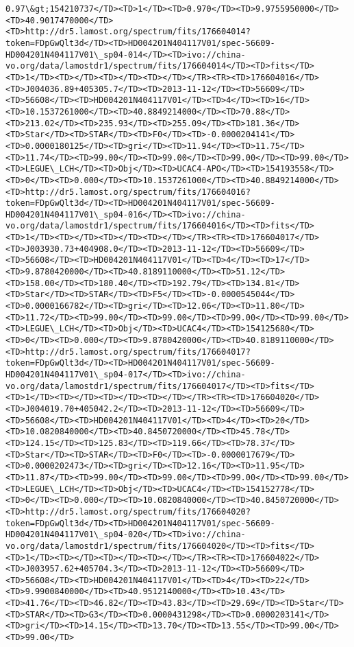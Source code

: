 \documentclass[11pt]{article}
\begin{document}
\begin{Verbatim}[commandchars=\\\{\}]
0.97\&gt;154210737</TD><TD>1</TD><TD>0.970</TD><TD>9.9755950000</TD><TD>40.9017470000</TD><TD>http://dr5.lamost.org/spectrum/fits/176604014?token=FDpGwQlt3d</TD><TD>HD004201N404117V01/spec-56609-HD004201N404117V01\_sp04-014</TD><TD>ivo://china-vo.org/data/lamostdr1/spectrum/fits/176604014</TD><TD>fits</TD><TD>1</TD><TD></TD><TD></TD><TD></TD></TR><TR><TD>176604016</TD><TD>J004036.89+405305.7</TD><TD>2013-11-12</TD><TD>56609</TD><TD>56608</TD><TD>HD004201N404117V01</TD><TD>4</TD><TD>16</TD><TD>10.1537261000</TD><TD>40.8849214000</TD><TD>70.88</TD><TD>213.02</TD><TD>235.93</TD><TD>255.09</TD><TD>181.36</TD><TD>Star</TD><TD>STAR</TD><TD>F0</TD><TD>-0.0000204141</TD><TD>0.0000180125</TD><TD>gri</TD><TD>11.94</TD><TD>11.75</TD><TD>11.74</TD><TD>99.00</TD><TD>99.00</TD><TD>99.00</TD><TD>99.00</TD><TD>LEGUE\_LCH</TD><TD>Obj</TD><TD>UCAC4-APO</TD><TD>154193558</TD><TD>0</TD><TD>0.000</TD><TD>10.1537261000</TD><TD>40.8849214000</TD><TD>http://dr5.lamost.org/spectrum/fits/176604016?token=FDpGwQlt3d</TD><TD>HD004201N404117V01/spec-56609-HD004201N404117V01\_sp04-016</TD><TD>ivo://china-vo.org/data/lamostdr1/spectrum/fits/176604016</TD><TD>fits</TD><TD>1</TD><TD></TD><TD></TD><TD></TD></TR><TR><TD>176604017</TD><TD>J003930.73+404908.0</TD><TD>2013-11-12</TD><TD>56609</TD><TD>56608</TD><TD>HD004201N404117V01</TD><TD>4</TD><TD>17</TD><TD>9.8780420000</TD><TD>40.8189110000</TD><TD>51.12</TD><TD>158.00</TD><TD>180.40</TD><TD>192.79</TD><TD>134.81</TD><TD>Star</TD><TD>STAR</TD><TD>F5</TD><TD>-0.0000545044</TD><TD>0.0000166782</TD><TD>gri</TD><TD>12.06</TD><TD>11.80</TD><TD>11.72</TD><TD>99.00</TD><TD>99.00</TD><TD>99.00</TD><TD>99.00</TD><TD>LEGUE\_LCH</TD><TD>Obj</TD><TD>UCAC4</TD><TD>154125680</TD><TD>0</TD><TD>0.000</TD><TD>9.8780420000</TD><TD>40.8189110000</TD><TD>http://dr5.lamost.org/spectrum/fits/176604017?token=FDpGwQlt3d</TD><TD>HD004201N404117V01/spec-56609-HD004201N404117V01\_sp04-017</TD><TD>ivo://china-vo.org/data/lamostdr1/spectrum/fits/176604017</TD><TD>fits</TD><TD>1</TD><TD></TD><TD></TD><TD></TD></TR><TR><TD>176604020</TD><TD>J004019.70+405042.2</TD><TD>2013-11-12</TD><TD>56609</TD><TD>56608</TD><TD>HD004201N404117V01</TD><TD>4</TD><TD>20</TD><TD>10.0820840000</TD><TD>40.8450720000</TD><TD>45.78</TD><TD>124.15</TD><TD>125.83</TD><TD>119.66</TD><TD>78.37</TD><TD>Star</TD><TD>STAR</TD><TD>F0</TD><TD>-0.0000017679</TD><TD>0.0000202473</TD><TD>gri</TD><TD>12.16</TD><TD>11.95</TD><TD>11.87</TD><TD>99.00</TD><TD>99.00</TD><TD>99.00</TD><TD>99.00</TD><TD>LEGUE\_LCH</TD><TD>Obj</TD><TD>UCAC4</TD><TD>154152778</TD><TD>0</TD><TD>0.000</TD><TD>10.0820840000</TD><TD>40.8450720000</TD><TD>http://dr5.lamost.org/spectrum/fits/176604020?token=FDpGwQlt3d</TD><TD>HD004201N404117V01/spec-56609-HD004201N404117V01\_sp04-020</TD><TD>ivo://china-vo.org/data/lamostdr1/spectrum/fits/176604020</TD><TD>fits</TD><TD>1</TD><TD></TD><TD></TD><TD></TD></TR><TR><TD>176604022</TD><TD>J003957.62+405704.3</TD><TD>2013-11-12</TD><TD>56609</TD><TD>56608</TD><TD>HD004201N404117V01</TD><TD>4</TD><TD>22</TD><TD>9.9900840000</TD><TD>40.9512140000</TD><TD>10.43</TD><TD>41.76</TD><TD>46.82</TD><TD>43.83</TD><TD>29.69</TD><TD>Star</TD><TD>STAR</TD><TD>G3</TD><TD>0.0000431298</TD><TD>0.0000203141</TD><TD>gri</TD><TD>14.15</TD><TD>13.70</TD><TD>13.55</TD><TD>99.00</TD><TD>99.00</TD>
\end{Verbatim}
\end{document}
